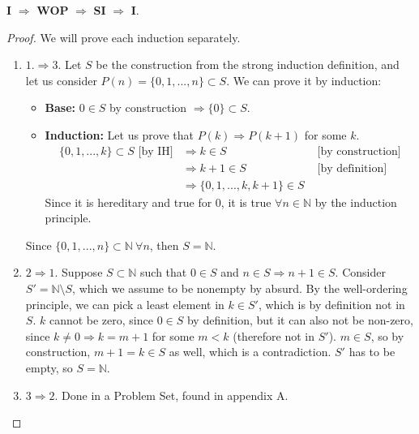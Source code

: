   \begin{theorem}\label{thm1}
    \textbf{I} $\Rightarrow$ \textbf{WOP} $\Rightarrow$ \textbf{SI} $\Rightarrow$ \textbf{I}.
  \end{theorem}
  \begin{proof}
    We will prove each induction separately.
    \begin{enumerate}
      \item $1. \Rightarrow 3.$ Let $S$ be the construction from the strong induction definition, and let us consider $P(n) = \{0, 1, ..., n\} \subset S$. We can prove it by induction: 
      \begin{itemize}
        \item[] \textbf{Base:} $0 \in S$ by construction $\Rightarrow \{0\} \subset S$. 
        \item[]\textbf{Induction:} Let us prove that $P(k) \Rightarrow P(k + 1)$ for some $k$.
        \begin{align*}
          \{0, 1, ..., k\} \subset S \text{ [by IH]} 
          &\Rightarrow k \in S &\text{ [by construction]} \\
          &\Rightarrow k + 1 \in S &\text{ [by definition]} \\
          &\Rightarrow \{0, 1, ..., k, k + 1\} \in S &
        \end{align*}
        Since it is hereditary and true for $0$, it is true $\forall n \in \mathbb{N}$ by the induction principle. 
      \end{itemize} 
      Since $\{0, 1, ..., n\} \subset \mathbb{N} \ \forall n$, then $S = \mathbb{N}$.
      \item $2 \Rightarrow 1$. Suppose $S \subset \mathbb{N}$ such that $0 \in S$ and $n \in S \Rightarrow n + 1 \in S$. Consider $S' = \mathbb{N} \setminus S$, which we assume to be nonempty by absurd. By the well-ordering principle, we can pick a least element in $k \in S'$, which is by definition not in $S$. $k$ cannot be zero, since $0 \in S$ by definition, but it can also not be non-zero, since $k \neq 0 \Rightarrow k = m + 1$ for some $m < k$ (therefore not in $S'$). $m \in S$, so by construction, $m + 1 = k \in S$ as well, which is a contradiction. $S'$ has to be empty, so $S = \mathbb{N}$. 
      \item $3 \Rightarrow 2$. Done in a Problem Set, found in appendix A.
    \end{enumerate}
  \end{proof}
